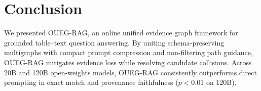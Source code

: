 \documentclass[runningheads]{llncs}
\begin{document}
\section{Conclusion}
We presented OUEG-RAG, an online unified evidence graph framework for grounded table--text question answering. By uniting schema-preserving multigraphs with compact prompt compression and non-filtering path guidance, OUEG-RAG mitigates evidence loss while resolving candidate collisions. Across 20B and 120B open-weights models, OUEG-RAG consistently outperforms direct prompting in exact match and provenance faithfulness ($p < 0.01$ on 120B).

\makeatletter
\renewenvironment{thebibliography}[1]
     {\section*{\refname}%
      \def\@biblabel##1{##1.}%
      \fontsize{7.0pt}{8.2pt}\selectfont
      \list{\@biblabel{\@arabic\c@enumiv}}%
           {\settowidth\labelwidth{\@biblabel{#1}}%
            \leftmargin\labelwidth
            \advance\leftmargin\labelsep
            \setlength{\itemsep}{-2.0pt}%
            \setlength{\parsep}{0pt}%
            \setlength{\topsep}{0pt}%
            \usecounter{enumiv}%
            \let\p@enumiv\@empty
            \renewcommand\theenumiv{\@arabic\c@enumiv}}%
      \renewcommand\newblock{\hskip .11em \@plus.33em \@minus.07em}%
      \sloppy\clubpenalty4000\widowpenalty4000%
      \sfcode`\.=1000\relax}
     {\def\@noitemerr
       {\@latex@warning{Empty `thebibliography' environment}}%
      \endlist}
\makeatother


\end{document}
